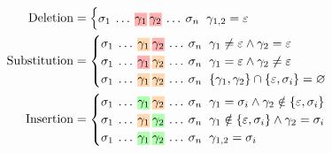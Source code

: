 \documentclass[sigplan,nonacm]{acmart}\settopmatter{printfolios=false,printccs=false,printacmref=false}
\begin{document}
\begin{align*}
    \text{Deletion}&=\begin{cases}
      \sigma_{1}\:\ldots\:\text{\hlred{$\gamma_1$}\:\hlred{$\gamma_2$}}\:\ldots\:\sigma_n\hspace{0.2cm}\gamma_{1, 2} = \varepsilon\label{eq:del}
    \end{cases}\\
    \text{Substitution}&=\begin{cases}
      \sigma_{1}\:\ldots\:\text{\hlorange{$\gamma_1$}\:\hlred{$\gamma_2$}}\:\ldots\:\sigma_n\hspace{0.2cm}\gamma_1 \neq \varepsilon \land \gamma_2 = \varepsilon\\
      \sigma_{1}\:\ldots\:\text{\hlred{$\gamma_1$}\:\hlorange{$\gamma_2$}}\:\ldots\:\sigma_n\hspace{0.2cm}\gamma_1 = \varepsilon \land \gamma_2 \neq \varepsilon\\
      \sigma_{1}\:\ldots\: \text{\hlorange{$\gamma_1$}\:\hlorange{$\gamma_2$}}\:\ldots\:\sigma_n\hspace{0.2cm}\{\gamma_1, \gamma_2\}\cap\{\varepsilon, \sigma_i\} = \varnothing
    \end{cases}\\
    \text{Insertion}&=\begin{cases}
      \sigma_{1}\:\ldots\: \text{\hlgreen{$\gamma_1$}\:\hlorange{$\gamma_2$}}\:\ldots\:\sigma_n\hspace{0.2cm}\gamma_1 = \sigma_i \land \gamma_2 \notin \{\varepsilon,  \sigma_i\}\label{eq:ins2}\\
      \sigma_{1}\:\ldots\: \text{\hlorange{$\gamma_1$}\:\hlgreen{$\gamma_2$}}\:\ldots\:\sigma_n\hspace{0.2cm}\gamma_1 \notin \{\varepsilon, \sigma_i\} \land \gamma_2 = \sigma_i\label{eq:ins1}\\
      \sigma_{1}\:\ldots\: \text{\hlgreen{$\gamma_1$}\:\hlgreen{$\gamma_2$}}\:\ldots\:\sigma_n\hspace{0.2cm}\gamma_{1,2} = \sigma_i\label{eq:copy}
    \end{cases}
\end{align*}
\end{document}
